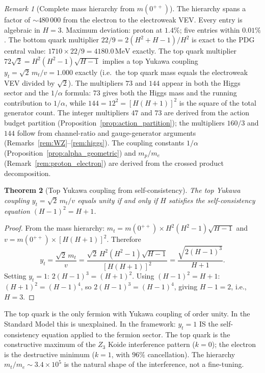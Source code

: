 \documentclass[11pt,a4paper]{article}
\newtheorem{theorem}{Theorem}[section]
\theoremstyle{definition}
\theoremstyle{remark}
\newtheorem{remark}[theorem]{Remark}
\begin{document}
\begin{remark}[Complete mass hierarchy from $m(0^{++})$]
The hierarchy spans a factor of $\sim\!480\,000$ from the electron to the electroweak VEV. Every entry is algebraic in $H=3$. Maximum deviation: proton at $1.4\%$; five entries within $0.01\%$. The bottom quark multiplier $22/9=2(H^2+H-1)/H^2$ is exact to the PDG central value: $1710\times 22/9=4180.0\,\mathrm{MeV}$ exactly. The top quark multiplier $72\sqrt{2}=H^2(H^2-1)\sqrt{H-1}$ implies a top Yukawa coupling $y_t=\sqrt{2}\,m_t/v=1.000$ exactly (i.e.\ the top quark mass equals the electroweak VEV divided by $\sqrt{2}$). The multipliers $73$ and $144$ appear in both the Higgs sector and the $1/\alpha$ formula: $73$ gives both the Higgs mass and the running contribution to $1/\alpha$, while $144=12^2=[H(H+1)]^2$ is the square of the total generator count. The integer multipliers $47$ and $73$ are derived from the action budget partition (Proposition~\ref{prop:action_partition}); the multipliers $160/3$ and $144$ follow from channel-ratio and gauge-generator arguments (Remarks~\ref{rem:WZ}--\ref{rem:higgs}). The coupling constants $1/\alpha$ (Proposition~\ref{prop:alpha_geometric}) and $m_p/m_e$ (Remark~\ref{rem:proton_electron}) are derived from the crossed product decomposition.
\end{remark}

\begin{theorem}[Top Yukawa coupling from self-consistency]\label{thm:top_yukawa}
The top Yukawa coupling $y_t=\sqrt{2}\,m_t/v$ equals unity if and only if $H$ satisfies the self-consistency equation $(H-1)^2=H+1$.
\end{theorem}

\begin{proof}
From the mass hierarchy: $m_t=m(0^{++})\times H^2(H^2-1)\sqrt{H-1}$ and $v=m(0^{++})\times[H(H+1)]^2$. Therefore
\[
y_t = \frac{\sqrt{2}\,m_t}{v} = \frac{\sqrt{2}\,H^2(H^2-1)\sqrt{H-1}}{[H(H+1)]^2} = \frac{\sqrt{2(H-1)^3}}{H+1}.
\]
Setting $y_t=1$: $2(H-1)^3=(H+1)^2$. Using $(H-1)^2=H+1$: $(H+1)^2=(H-1)^4$, so $2(H-1)^3=(H-1)^4$, giving $H-1=2$, i.e., $H=3$.
\end{proof}

The top quark is the only fermion with Yukawa coupling of order unity. In the Standard Model this is unexplained. In the framework: $y_t=1$ IS the self-consistency equation applied to the fermion sector. The top quark is the constructive maximum of the $Z_3$ Koide interference pattern ($k=0$); the electron is the destructive minimum ($k=1$, with $96\%$ cancellation). The hierarchy $m_t/m_e\sim 3.4\times 10^5$ is the natural shape of the interference, not a fine-tuning.
\end{document}
